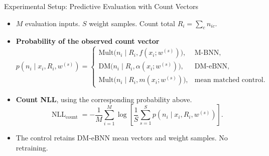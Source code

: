 \begin{frame}{Experimental Setup: Predictive Evaluation with Count Vectors}
\label{frm:appendix-count-nll-models}
\setlength{\abovedisplayskip}{5pt}
\setlength{\belowdisplayskip}{5pt}
\begin{itemize}
\setlength{\itemsep}{3mm}
\item $M$ evaluation inputs. $S$ weight samples. Count total $R_i=\sum_c n_{ic}$.
\item \textbf{Probability of the observed count vector}
{\small
\[
p(n_i\mid x_i,R_i,w^{(s)})=
\begin{cases}
\mathrm{Mult}\bigl(n_i\mid R_i,f(x_i;w^{(s)})\bigr), & \text{M-BNN},\\[2mm]
\mathrm{DM}\bigl(n_i\mid R_i,\alpha(x_i;w^{(s)})\bigr), & \text{DM-eBNN},\\[2mm]
\mathrm{Mult}\bigl(n_i\mid R_i,m(x_i;w^{(s)})\bigr), & \text{mean matched control}.
\end{cases}
\]
}
\item \textbf{Count NLL}, using the corresponding probability above.
\[
\operatorname{NLL}_{\mathrm{count}}
=-\frac{1}{M}\sum_{i=1}^{M}
\log\!\left[\frac{1}{S}\sum_{s=1}^{S}p(n_i\mid x_i,R_i,w^{(s)})\right].
\]
\item The control retains DM-eBNN mean vectors and weight samples. No retraining.
\end{itemize}
\end{frame}

